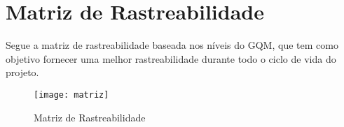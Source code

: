 \chapter{Matriz de Rastreabilidade}

	Segue a matriz de rastreabilidade baseada nos níveis do GQM, que tem como objetivo fornecer uma melhor rastreabilidade durante todo o ciclo de vida do projeto.

\begin{figure}[!htb]
\centering
\texttt{[image: matriz]}
\caption{Matriz de Rastreabilidade}
\end{figure}